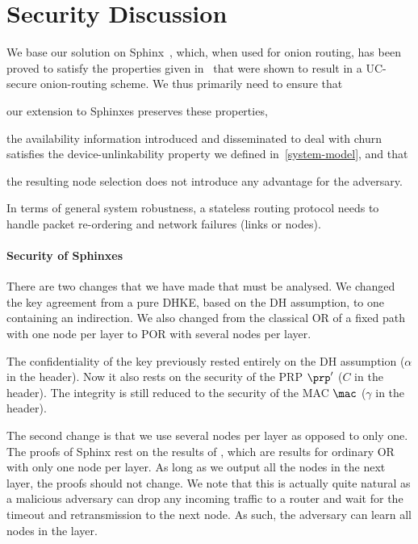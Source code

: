 \section{Security Discussion}%
\label{security-discussion}



We base our solution on Sphinx~\cite{Sphinx}, which, when used for
onion routing, has been proved to satisfy the properties given
in~\cite{CLOnionRouting} that were shown to result in a UC-secure
onion-routing scheme. We thus primarily need to ensure that
\begin{enumerate*} \item our extension to Sphinxes preserves these
  properties, \item the availability information introduced and
  disseminated to deal with churn satisfies the device-unlinkability
  property we defined in~\cref{system-model}, and that \item the
  resulting node selection does not introduce any advantage for the
  adversary. \end{enumerate*} In terms of general system robustness, a
stateless routing protocol needs to handle packet re-ordering and
network failures (links or nodes).

\paragraph*{Security of Sphinxes}

There are two changes that we have made that must be analysed.
We changed the key agreement from a pure \ac{DHKE}, \ie based on the \ac{DH} 
assumption, to one containing an indirection.
We also changed from the classical \ac{OR} of a fixed path with one node per 
layer to \ac{POR} with several nodes per layer.

The confidentiality of the key previously rested entirely on the \ac{DH} 
assumption (\(\alpha\) in the header).
Now it also rests on the security of the \ac{PRP} \(\prp'\) (\(C\) in the 
header).
The integrity is still reduced to the security of the \ac{MAC} \(\mac\) 
(\(\gamma\) in the header).

The second change is that we use several nodes per layer as opposed to only 
one.
The proofs of Sphinx rest on the results of \textcite{CLOnionRouting}, which 
are results for ordinary \ac{OR} with only one node per layer.
As long as we output all the nodes in the next layer, the proofs should not 
change.
We note that this is actually quite natural as a malicious adversary can drop 
any incoming traffic to a router and wait for the timeout and retransmission to 
the next node.
As such, the adversary can learn all nodes in the layer.

